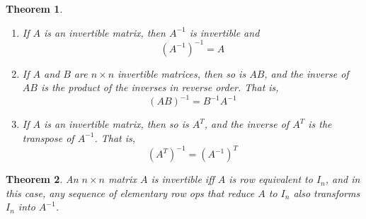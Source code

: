 \documentclass{article}
\theoremstyle{plain}
\newtheorem{thm}{Theorem}[section]
\theoremstyle{definition}
\theoremstyle{remark}
\begin{document}
\begin{thm}
    \begin{enumerate}
        \item[a.] If $A$ is an invertible matrix, then $A^{-1}$ is invertible and $$(A^{-1})^{-1}=A$$
        \item[b.] If $A$ and $B$ are $n\times n$ invertible matrices, then so is $AB$, and the inverse of $AB$ is the product of the inverses in reverse order. That is, $$(AB)^{-1}=B^{-1}A^{-1}$$
        \item[c.] If $A$ is an invertible matrix, then so is $A^T$, and the inverse of $A^T$ is the transpose of $A^{-1}$. That is, $$(A^T)^{-1}=(A^{-1})^T$$
    \end{enumerate}
\end{thm}

\begin{thm}
    An $n\times n$ matrix $A$ is invertible iff $A$ is row equivalent to $I_n$, and in this case, any sequence of elementary row ops that reduce $A$ to $I_n$ also transforms $I_n$ into $A^{-1}$.
\end{thm}
\end{document}
